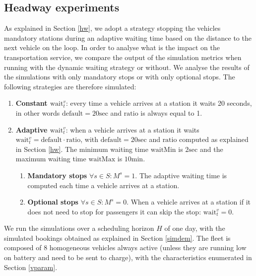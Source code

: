 \documentclass[12pt,a4paper]{article}
\begin{document}
\subsection{Headway experiments}\label{hwexperiments}
As explained in Section \ref{hw}, we adopt a strategy stopping the vehicles mandatory stations during an adaptive waiting time based on the distance to the next vehicle on the loop. In order to analyse what is the impact on the transportation service, we compare the output of the simulation metrics when running with the dynamic waiting strategy or without. We analyse the results of the simulations with only mandatory stops or with only optional stops. The following strategies are therefore simulated:
\begin{enumerate}
\setlength\itemsep{1pt}
\item \textbf{Constant $\text{wait}_t^{v}$}: every time a vehicle arrives at a station it waits 20 seconds, in other words $\text{default}= 20\text{sec}$ and $\text{ratio}$ is always equal to 1. 
\item \textbf{Adaptive $\text{wait}_t^{v}$}: when a vehicle arrives at a station it waits $\text{wait}_t^{v} = \text{default} \cdot \text{ratio}$, with $\text{default} = 20\text{sec}$ and $\text{ratio}$ computed as explained in Section \ref{hw}. The minimum waiting time $\text{waitMin}$ is $2\text{sec}$ and the maximum waiting time $\text{waitMax}$ is $10\text{min}$.
\begin{enumerate}
\item \textbf{Mandatory stops} $\forall s \in S: M^{s} = 1$. The adaptive waiting time is computed each time a vehicle arrives at a station.
\item \textbf{Optional stops} $\forall s \in S: M^{s} = 0$. When a vehicle arrives at a station if it does not need to stop for passengers it can skip the stop: $\text{wait}_{t}^{v} = 0$.
\end{enumerate}
\end{enumerate}
We run the simulations over a scheduling horizon $H$ of one day, with the simulated bookings obtained as explained in Section \ref{simdem}. The fleet is composed of 8 homogeneous vehicles always active (unless they are running low on battery and need to be sent to charge), with the characteristics enumerated in Section \ref{vparam}. 
\end{document}
